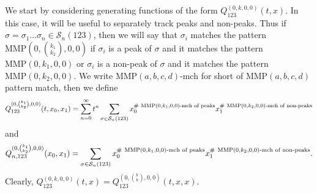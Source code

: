 \documentclass[
final,nomarks
]{dmtcs-episciences}
\newcommand{\Sn}[1]{\mathcal{S}_{#1}}
\newcommand{\Qm}[1]{Q_{123}^{(#1)}(t,x)}
\newcommand{\Qmz}[2]{Q_{123}^{(0,\binom{#1}{#2},0,0)}(t,x_0,x_1)}
\newcommand{\Qmzn}[3]{Q_{#3,123}^{(0,\binom{#1}{#2},0,0)}(x_0,x_1)}
\newcommand{\Qmzx}[3]{Q_{123}^{(0,\binom{#1}{#2},0,0)}(t,#3)}
\newcommand{\MMP}{\mathrm{MMP}}
\begin{document}
We start by considering generating functions of the form  \begin{math}\Qm{0,k,0,0}\end{math}. 
In this case, it will be useful to separately track peaks and non-peaks. 
Thus if \begin{math}\sigma = \sigma_1 \ldots \sigma_n \in \Sn{n}(123)\end{math}, then we will say 
that \begin{math}\sigma_i\end{math} matches the pattern \begin{math}\MMP(0,\binom{k_1}{k_2},0,0)\end{math} if \begin{math}\sigma_i\end{math} is a 
peak of \begin{math}\sigma\end{math} and it matches the pattern \begin{math}\MMP(0,k_1,0,0)\end{math} 
or \begin{math}\sigma_i\end{math} is a non-peak of \begin{math}\sigma\end{math} and it matches the pattern \begin{math}\MMP(0,k_2,0,0)\end{math}. 
We write \begin{math}\MMP(a,b,c,d)\end{math}-mch for short of \begin{math}\MMP(a,b,c,d)\end{math} pattern match, then we define 
\begin{equation}
\Qmz{k_1}{k_2}=\sum_{n=0}^{\infty}t^n \sum_{\sigma\in\Sn{n}(123)}x_0^{\#\ \MMP(0,k_1,0,0)\textnormal{-mch of peaks}}x_1^{\#\ \MMP(0,k_2,0,0)\textnormal{-mch of non-peaks}}
\end{equation}
and
\begin{equation}
\Qmzn{k_1}{k_2}{n}=\sum_{\sigma\in\Sn{n}(123)}x_0^{\#\ \MMP(0,k_1,0,0)\textnormal{-mch of peaks}}x_1^{\#\ \MMP(0,k_2,0,0)\textnormal{-mch of non-peaks}}.
\end{equation}
Clearly, \begin{math}\Qm{0,k,0,0}=\Qmzx{k}{k}{x,x}\end{math}. 
\end{document}

